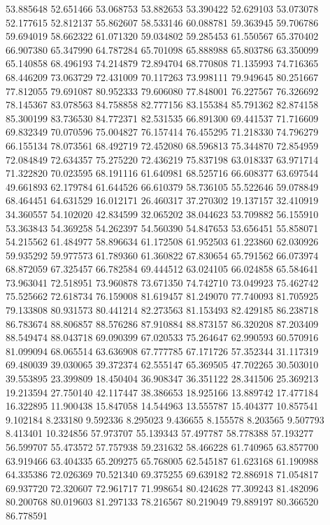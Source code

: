 53.885648
52.651466
53.068753
53.882653
53.390422
52.629103
53.073078
52.177615
52.812137
55.862607
58.533146
60.088781
59.363945
59.706786
59.694019
58.662322
61.071320
59.034802
59.285453
61.550567
65.370402
66.907380
65.347990
64.787284
65.701098
65.888988
65.803786
63.350099
65.140858
68.496193
74.214879
72.894704
68.770808
71.135993
74.716365
68.446209
73.063729
72.431009
70.117263
73.998111
79.949645
80.251667
77.812055
79.691087
80.952333
79.606080
77.848001
76.227567
76.326692
78.145367
83.078563
84.758858
82.777156
83.155384
85.791362
82.874158
85.300199
83.736530
84.772371
82.531535
66.891300
69.441537
71.716609
69.832349
70.070596
75.004827
76.157414
76.455295
71.218330
74.796279
66.155134
78.073561
68.492719
72.452080
68.596813
75.344870
72.854959
72.084849
72.634357
75.275220
72.436219
75.837198
63.018337
63.971714
71.322820
70.023595
68.191116
61.640981
68.525716
66.608377
63.697544
49.661893
62.179784
61.644526
66.610379
58.736105
55.522646
59.078849
68.464451
64.631529
16.012171
26.460317
37.270302
19.137157
32.410919
34.360557
54.102020
42.834599
32.065202
38.044623
53.709882
56.155910
53.363843
54.369258
54.262397
54.560390
54.847653
53.656451
55.858071
54.215562
61.484977
58.896634
61.172508
61.952503
61.223860
62.030926
59.935292
59.977573
61.789360
61.360822
67.830654
65.791562
66.073974
68.872059
67.325457
66.782584
69.444512
63.024105
66.024858
65.584641
73.963041
72.518951
73.960878
73.671350
74.742710
73.049923
75.462742
75.525662
72.618734
76.159008
81.619457
81.249070
77.740093
81.705925
79.133808
80.931573
80.441214
82.273563
81.153493
82.429185
86.238718
86.783674
88.806857
88.576286
87.910884
88.873157
86.320208
87.203409
88.549474
88.043718
69.090399
67.020533
75.264647
62.990593
60.570916
81.099094
68.065514
63.636908
67.777785
67.171726
57.352344
31.117319
69.480039
39.030065
39.372374
62.555147
65.369505
47.702265
30.503010
39.553895
23.399809
18.450404
36.908347
36.351122
28.341506
25.369213
19.213594
27.750140
42.117447
38.386653
18.925166
13.889742
17.477184
16.322895
11.900438
15.847058
14.544963
13.555787
15.404377
10.857541
9.102184
8.233180
9.592336
8.295023
9.436655
8.155578
8.203565
9.507793
8.413401
10.324856
57.973707
55.139343
57.497787
58.778388
57.193277
56.599707
55.473572
57.757938
59.231632
58.466228
61.740965
63.857700
63.919466
63.404335
65.209275
65.768005
62.545187
61.623168
61.190988
64.335386
72.026369
70.521340
69.375255
69.639182
72.886918
71.054817
69.937720
72.320607
72.961717
71.998654
80.424628
77.309243
81.482096
80.200768
80.019603
81.297133
78.216567
80.219049
79.889197
80.366520
86.778591

